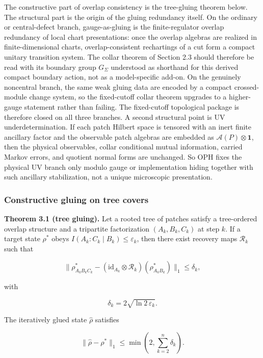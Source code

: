 The constructive part of overlap consistency is the tree-gluing theorem below. The structural part is the origin of the gluing redundancy itself. On the ordinary or central-defect branch, gauge-as-gluing is the finite-regulator overlap redundancy of local chart presentations: once the overlap algebras are realized in finite-dimensional charts, overlap-consistent rechartings of a cut form a compact unitary transition system. The collar theorem of Section 2.3 should therefore be read with its boundary group \(G_\Sigma\) understood as shorthand for this derived compact boundary action, not as a model-specific add-on. On the genuinely noncentral branch, the same weak gluing data are encoded by a compact crossed-module change system, so the fixed-cutoff collar theorem upgrades to a higher-gauge statement rather than failing. The fixed-cutoff topological package is therefore closed on all three branches.
A second structural point is UV underdetermination. If each patch Hilbert space is tensored with an inert finite ancillary factor and the observable patch algebras are embedded as \(\mathcal A(P)\otimes \mathbf 1\), then the physical observables, collar conditional mutual information, carried Markov errors, and quotient normal forms are unchanged. So OPH fixes the physical UV branch only modulo gauge or implementation hiding together with such ancillary stabilization, not a unique microscopic presentation.

\subsubsection{Constructive gluing on tree covers}\label{31-constructive-gluing-on-tree-covers}

\textbf{Theorem 3.1 (tree gluing).} Let a rooted tree of patches satisfy a tree-ordered overlap structure and a tripartite factorization \((A_k, B_k, C_k)\) at step \(k\). If a target state \(\rho^{\ast}\) obeys \(I(A_k:C_k \mid B_k) \le \varepsilon_k\), then there exist recovery maps \(\mathcal{R}_k\) such that

\[
\| \rho^{\ast}_{A_k B_k C_k} - (\mathrm{id}_{A_k} \otimes \mathcal{R}_k)(\rho^{\ast}_{A_k B_k}) \|_1
\le \delta_k,
\]

with

\[
\delta_k = 2 \sqrt{\ln 2\, \varepsilon_k}.
\]

The iteratively glued state \(\hat{\rho}\) satisfies

\[
\| \hat{\rho} - \rho^{\ast} \|_1 \le \min\left(2, \sum_{k=2}^n \delta_k\right).
\]

